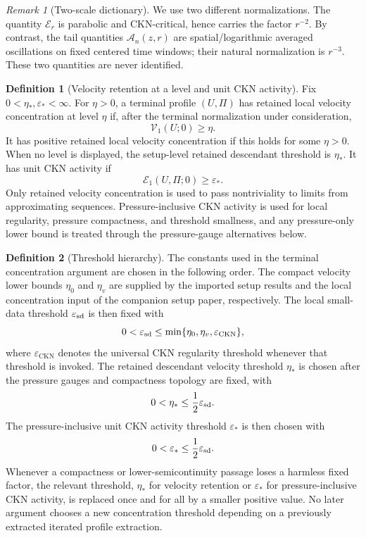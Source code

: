\documentclass[11pt]{amsart}
\numberwithin{equation}{section}
\theoremstyle{plain}
\theoremstyle{definition}
\newtheorem{definition}[definition]{Definition}
\theoremstyle{remark}
\newtheorem{remark}[remark]{Remark}
\newcommand{\eps}{\varepsilon}
\newcommand{\CKN}{\mathrm{CKN}}
\newcommand{\calE}{\mathcal E}
\newcommand{\Vel}{\mathcal V}
\begin{document}
\begin{remark}[Two-scale dictionary]
\label{rem:two-scale-dictionary}
We use two different normalizations.  The quantity \(\calE_r\) is parabolic and
CKN-critical, hence carries the factor \(r^{-2}\).  By contrast, the tail
quantities \(\mathcal A_n(z,r)\) are spatial/logarithmic averaged oscillations
on fixed centered time windows; their natural normalization is \(r^{-3}\).
These two quantities are never identified.
\end{remark}

\begin{definition}[Velocity retention at a level and unit CKN activity]
\label{def:velocity-retention-unit-activity}
Fix \(0<\eta_*,\eps_*<\infty\).  For \(\eta>0\), a terminal profile
\((U,\Pi)\) has retained local velocity concentration at level \(\eta\) if,
after the terminal normalization under consideration,
\[
   \Vel_1(U;0)\ge \eta .
\]
It has positive retained local velocity concentration if this holds for some
\(\eta>0\).  When no level is displayed, the setup-level retained descendant
threshold is \(\eta_*\).
It has unit CKN activity if
\[
   \calE_1(U,\Pi;0)\ge \eps_* .
\]
Only retained velocity concentration is used to pass nontriviality to limits
from approximating sequences.  Pressure-inclusive CKN activity is used for
local regularity, pressure compactness, and threshold smallness, and any
pressure-only lower bound is treated through the pressure-gauge alternatives
below.
\end{definition}

\begin{definition}[Threshold hierarchy]
\label{def:threshold-hierarchy}
The constants used in the terminal concentration argument are chosen in the following order.
The compact velocity lower bounds \(\eta_0\) and \(\eta_v\) are supplied by
the imported setup results and the local concentration input of the companion
setup paper, respectively.  The local small-data threshold
\(\eps_{\rm sd}\) is then fixed with
\[
   0<\eps_{\rm sd}\le \min\{\eta_0,\eta_v,\eps_{\CKN}\},
\]
where \(\eps_{\CKN}\) denotes the universal CKN regularity threshold whenever
that threshold is invoked.  The retained descendant velocity threshold
\(\eta_*\) is chosen after the pressure gauges and compactness topology are fixed, with
\[
   0<\eta_*\le \frac12\eps_{\rm sd}.
\]
The pressure-inclusive unit CKN activity threshold \(\eps_*\) is then
chosen with
\[
   0<\eps_*\le \frac12\eps_{\rm sd}.
\]
Whenever a compactness or lower-semicontinuity passage loses a harmless fixed
factor, the relevant threshold, \(\eta_*\) for velocity retention or
\(\eps_*\) for pressure-inclusive CKN activity, is replaced once and for all
by a smaller positive value.  No later argument chooses a new concentration
threshold depending on a previously extracted iterated profile extraction.
\end{definition}
\end{document}
